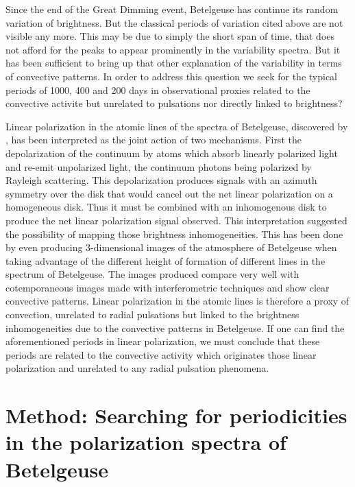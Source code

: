 \documentclass{aa}
\begin{document}
Since the end of the Great Dimming event, Betelgeuse has continue its random variation of brightness. But the classical periods 
of variation cited above are not visible any more. This may be due to simply the short span of time, that does not afford for 
the peaks to appear prominently in the variability spectra. But it has been sufficient to bring up that other explanation of the variability
in terms  of convective patterns. In order to address this question we seek for the typical periods of 1000, 400 and 200 days in  
observational proxies related to the convective activite but unrelated to pulsations nor directly linked to brightness?

Linear polarization in the atomic lines of the spectra of Betelgeuse, discovered by \cite{auriere_discovery_2016}, has been interpreted as the joint action of 
two mechanisms. First the depolarization of the continuum by atoms which absorb linearly polarized light and re-emit unpolarized light, the 
continuum photons being polarized by Rayleigh scattering. This depolarization produces signals with an azimuth symmetry over the disk that 
would  cancel out the net linear polarization on a homogeneous disk. Thus it must be combined with an inhomogenous disk to produce the net linear polarization 
signal observed. This interpretation suggested the possibility of mapping those brightness inhomogeneities. This has been done by \cite{lopez_ariste_convective_2018} 
even producing 3-dimensional images of the atmosphere of Betelgeuse \citep{lopez_ariste_three-dimensional_2022} when taking advantage of the different height of formation of 
different lines in the spectrum of Betelgeuse. The images produced compare very well with cotemporaneous images made with interferometric 
techniques and show clear convective patterns. Linear polarization in the atomic lines is therefore a proxy of convection, unrelated to radial 
pulsations but linked to the brightness inhomogeneities due to the convective patterns in Betelgeuse. If one can find the aforementioned periods 
in linear polarization, we must conclude that these periods are related to the convective activity which originates those linear polarization 
and unrelated to any radial pulsation phenomena.



\section{Method: Searching for periodicities in the polarization spectra of Betelgeuse}
\end{document}
